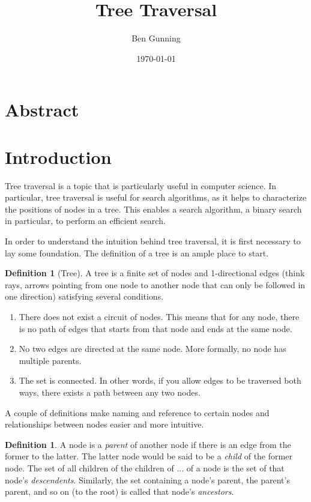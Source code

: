 \documentclass[12pt]{article}
\title{\textbf{\Large{Tree Traversal}}}
\author{Ben Gunning}
\date{\today}
\theoremstyle{definition}
\newtheorem{definition}[theorem]{Definition}
\theoremstyle{remark}
\begin{document}
\maketitle

\section*{Abstract}

\section{Introduction}
Tree traversal is a topic that is particularly useful in computer science. In particular, tree traversal is useful for search algorithms, as it helps to characterize the positions of nodes in a tree. This enables a search algorithm, a binary search in particular, to perform an efficient search.

In order to understand the intuition behind tree traversal, it is first necessary to lay some foundation. The definition of a tree is an ample place to start.

\begin{definition}[Tree]
A tree is a finite set of nodes and 1-directional edges (think rays, arrows pointing from one node to another node that can only be followed in one direction) satisfying several conditions.
	\begin{enumerate}
		\item{There does not exist a circuit of nodes. This means that for any node, there is no path of edges that starts from that node and ends at the same node.}
		\item{No two edges are directed at the same node. More formally, no node has multiple parents.}
		\item{The set is connected. In other words, if you allow edges to be traversed both ways, there exists a path between any two nodes.}
	\end{enumerate}
\end{definition}

A couple of definitions make naming and reference to certain nodes and relationships between nodes easier and more intuitive.

\begin{definition}
A node is a \emph{parent} of another node if there is an edge from the former to the latter. The latter node would be said to be a \emph{child} of the former node. The set of all children of the children of ... of a node is the set of that node's \emph{descendents}. Similarly, the set containing a node's parent,
the parent's parent, and so on (to the root) is called that node's \emph{ancestors}.
\end{definition}
\end{document}
